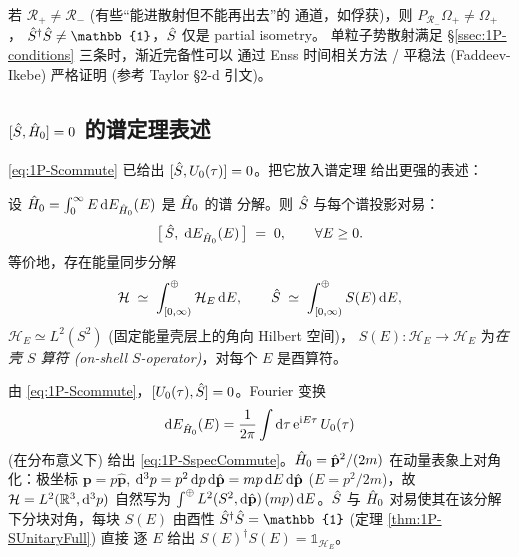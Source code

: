 \begin{remark}[渐近完备性是核心假设]
若 $\mathcal{R}_+\neq\mathcal{R}_-$ (有些“能进散射但不能再出去”的
通道，如俘获)，则 $P_{\mathcal{R}_-}\Omega_+\neq\Omega_+$，
$\Smat^\dagger\Smat\neq\mathbb{1}$，$\hat{S}$ 仅是 partial isometry。
单粒子势散射满足 \S\ref{ssec:1P-conditions} 三条时，渐近完备性可以
通过 Enss 时间相关方法 / 平稳法 (Faddeev-Ikebe) 严格证明
(参考 Taylor §2-d 引文)。
\end{remark}

\subsection{$[\hat{S},\hat{H}_0]=0$ 的谱定理表述}
\label{ssec:1P-SpectralEnergy}

\eqref{eq:1P-Scommute} 已给出 $[\hat{S},U_0(\tau)]=0$。把它放入谱定理
给出更强的表述：

\begin{theorem}
\label{thm:1P-SBlockDiag}
设 $\hat{H}_0=\int_0^\infty E\,\mathrm{d} E_{\hat{H}_0}(E)$ 是 $\hat{H}_0$ 的谱
分解。则 $\hat{S}$ 与每个谱投影对易：
\begin{equation}
  \bigl[\,\hat{S},\;\mathrm{d} E_{\hat{H}_0}(E)\,\bigr]\;=\;0,\qquad\forall E\ge 0.
  \label{eq:1P-SspecCommute}
\end{equation}
等价地，存在能量同步分解
\begin{equation}
  \mathcal{H} \;\simeq\; \int^{\oplus}_{[0,\infty)} \mathcal{H}_E\,\mathrm{d} E,\qquad
  \hat{S} \;\simeq\; \int^{\oplus}_{[0,\infty)} S(E)\,\mathrm{d} E,
  \label{eq:1P-SdirectInt}
\end{equation}
$\mathcal{H}_E\simeq L^2(S^2)$ (固定能量壳层上的角向 Hilbert 空间)，
$S(E):\mathcal{H}_E\to\mathcal{H}_E$ 为\emph{在壳 $S$ 算符
(on-shell $S$-operator)}，对每个 $E$ 是酉算符。
\end{theorem}

\begin{proof*}[证明梗概]
由 \eqref{eq:1P-Scommute}，$[U_0(\tau),\hat{S}]=0$。Fourier 变换
\[
  \mathrm{d} E_{\hat{H}_0}(E) = \frac{1}{2\pi}\int\mathrm{d}\tau\,\mathrm{e}^{\mathrm{i} E\tau}\,U_0(\tau)
\]
(在分布意义下) 给出 \eqref{eq:1P-SspecCommute}。$\hat{H}_0=\hat{\mathbf{p}}^2/(2m)$
在动量表象上对角化：极坐标 $\mathbf{p}=p\hat{\mathbf{p}}$,
$\mathrm{d}^3p = p^2\,\mathrm{d} p\,\mathrm{d}\hat{\mathbf{p}}=mp\,\mathrm{d} E\,\mathrm{d}\hat{\mathbf{p}}$
($E=p^2/2m$)，故 $\mathcal{H}=L^2(\mathbb{R}^3,\mathrm{d}^3p)$ 自然写为
$\int^\oplus L^2(S^2,\mathrm{d}\hat{\mathbf{p}})\,(mp)\,\mathrm{d} E$。$\hat{S}$ 与
$\hat{H}_0$ 对易使其在该分解下分块对角，每块 $S(E)$ 由酉性
$\Smat^\dagger\Smat=\mathbb{1}$ (定理 \ref{thm:1P-SUnitaryFull}) 直接
逐 $E$ 给出 $S(E)^\dagger S(E)=\mathbb{1}_{\mathcal{H}_E}$。
\end{proof*}

